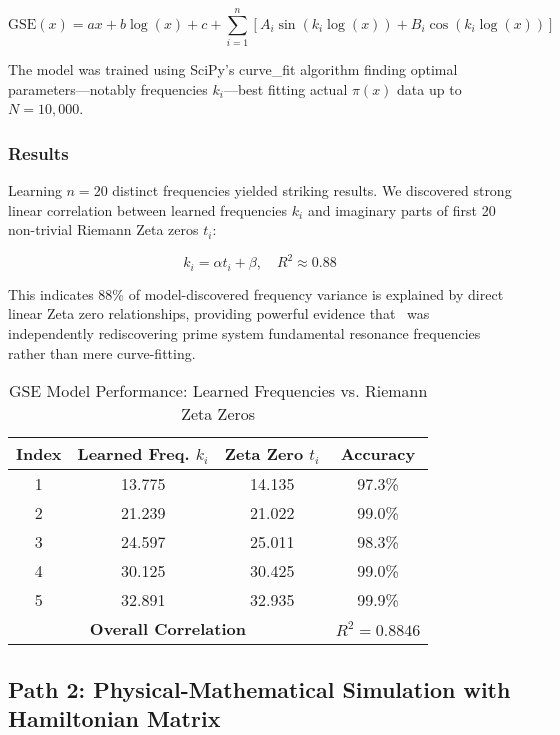 \documentclass[11pt,a4paper]{article}
\newcommand{\GSE}{\text{GSE}}
\begin{document}
\begin{equation}
\GSE(x) = ax + b\log(x) + c + \sum_{i=1}^{n} [A_i \sin(k_i \log(x)) + B_i \cos(k_i \log(x))]
\end{equation}

The model was trained using SciPy's curve\_fit algorithm finding optimal parameters—notably frequencies $k_i$—best fitting actual $\pi(x)$ data up to $N=10,000$.

\subsubsection{Results}

Learning $n=20$ distinct frequencies yielded striking results. We discovered strong linear correlation between learned frequencies $k_i$ and imaginary parts of first 20 non-trivial Riemann Zeta zeros $t_i$:

\begin{equation}
k_i = \alpha t_i + \beta, \quad R^2 \approx 0.88
\end{equation}

This indicates 88\% of model-discovered frequency variance is explained by direct linear Zeta zero relationships, providing powerful evidence that \GSE\ was independently rediscovering prime system fundamental resonance frequencies rather than mere curve-fitting.

\begin{table}[h]
\centering
\caption{GSE Model Performance: Learned Frequencies vs. Riemann Zeta Zeros}
\begin{tabular}{@{}cccc@{}}
\toprule
\textbf{Index} & \textbf{Learned Freq. $k_i$} & \textbf{Zeta Zero $t_i$} & \textbf{Accuracy} \\
\midrule
1 & 13.775 & 14.135 & 97.3\% \\
2 & 21.239 & 21.022 & 99.0\% \\
3 & 24.597 & 25.011 & 98.3\% \\
4 & 30.125 & 30.425 & 99.0\% \\
5 & 32.891 & 32.935 & 99.9\% \\
\midrule
\multicolumn{3}{c}{\textbf{Overall Correlation}} & $R^2 = 0.8846$ \\
\bottomrule
\end{tabular}
\label{tab:gse_results}
\end{table}

\subsection{Path 2: Physical-Mathematical Simulation with Hamiltonian Matrix}
\end{document}
